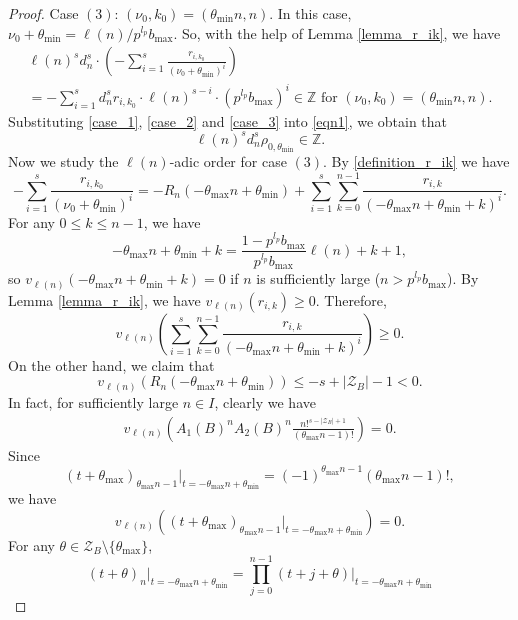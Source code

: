 \documentclass[12pt]{article}
\numberwithin{equation}{section}
\begin{document}
\begin{proof}
Case $(3)$: $(\nu_0,k_0) = (\theta_{\min}n,n)$. In this case, $\nu_0+\theta_{\min} = \ell(n)/p^{l_p}b_{\max}$. So, with the help of Lemma \ref{lemma_r_ik}, we have
\begin{multline}\label{case_3}
\ell(n)^sd_n^s \cdot \left(-\sum_{i=1}^{s}\frac{r_{i,k_0}}{(\nu_0+\theta_{\min})^{i}}\right)\\ = -\sum_{i=1}^{s} d_n^{s}r_{i,k_0} \cdot \ell(n)^{s-i}\cdot(p^{l_p}b_{\max})^{i}\in \mathbb{Z} \text{~for~} (\nu_0,k_0)= (\theta_{\min}n,n). 
\end{multline}
Substituting \eqref{case_1}, \eqref{case_2} and \eqref{case_3} into \eqref{eqn1}, we obtain that
\[ \ell(n)^sd_n^s \rho_{0,\theta_{\min}} \in \mathbb{Z}. \]
Now we study the $\ell(n)$-adic order for case $(3)$. By \eqref{definition_r_ik} we have
\begin{equation}\label{eqn2} -\sum_{i=1}^{s}\frac{r_{i,k_0}}{(\nu_0+\theta_{\min})^{i}} = -R_n(-\theta_{\max}n+\theta_{\min}) + \sum_{i=1}^{s}\sum_{k=0}^{n-1} \frac{r_{i,k}}{(-\theta_{\max}n+\theta_{\min}+k)^i}. 
\end{equation}
For any $0 \leqslant k \leqslant n-1$, we have
\[ -\theta_{\max}n+\theta_{\min}+k = \frac{1-p^{l_p}b_{\max}}{p^{l_p}b_{\max}}\ell(n) + k +1, \]
so $v_{\ell(n)}(-\theta_{\max}n+\theta_{\min}+k) = 0$ if $n$ is sufficiently large ($n > p^{l_p}b_{\max}$). By Lemma \ref{lemma_r_ik}, we have $v_{\ell(n)}(r_{i,k}) \geqslant 0$. Therefore,
\begin{equation}\label{eqn3}
v_{\ell(n)}\left( \sum_{i=1}^{s}\sum_{k=0}^{n-1} \frac{r_{i,k}}{(-\theta_{\max}n+\theta_{\min}+k)^i} \right) \geqslant 0. 
\end{equation}
On the other hand, we claim that
\begin{equation}\label{eqn4}
v_{\ell(n)}\left( R_n(-\theta_{\max}n+\theta_{\min}) \right) \leqslant -s + |\mathcal{Z}_B| - 1 < 0.
\end{equation}
In fact, for sufficiently large $n \in I$, clearly we have
\begin{align*}
			v_{\ell(n)}\left( A_1(B)^{n}A_2(B)^{n}\frac{n!^{s-|\mathcal{Z}_B|+1}}{(\theta_{\max}n-1)!} \right) = 0.
\end{align*}
Since 
\[ (t+\theta_{\max})_{\theta_{\max}n-1} \big|_{t = -\theta_{\max}n+\theta_{\min}} = (-1)^{\theta_{\max}n-1}(\theta_{\max}n-1)!, \]
we have
\[ v_{\ell(n)}\left( (t+\theta_{\max})_{\theta_{\max}n-1} \big|_{t = -\theta_{\max}n+\theta_{\min}}\right) = 0. \]
For any $\theta \in \mathcal{Z}_{B} \setminus \{ \theta_{\max}\}$, 
\[ (t+\theta)_{n} \big|_{t = -\theta_{\max}n+\theta_{\min}} = \prod_{j=0}^{n-1} (t+j+\theta) \big|_{t = -\theta_{\max}n+\theta_{\min}} \]

\end{proof}
\end{document}
